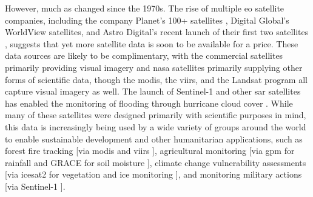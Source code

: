 However, much as changed since the 1970s. The rise of multiple \ac{eo} satellite companies, including the company Planet's 100+ satellites \cite{tepperSatelliteMakerPlanet2015}, Digital Global's WorldView satellites, and Astro Digital’s recent launch of their first two satellites \cite{shieberAstroDigitalLaunched2017}, suggests that yet more satellite data is soon to be available for a price. These data sources are likely to be complimentary, with the commercial satellites primarily providing visual imagery and \ac{nasa} satellites primarily supplying other forms of scientific data, though the \ac{modis}, the \ac{viirs}, and the Landsat program all capture visual imagery as well. The launch of Sentinel-1 and other \ac{sar} satellites has enabled the monitoring of flooding through hurricane cloud cover \cite{zhangMappingExtentMagnitude2018}. While many of these satellites were designed primarily with scientific purposes in mind, this data is increasingly being used by a wide variety of groups around the world to enable sustainable development and other humanitarian applications, such as forest fire tracking [via \ac{modis} and \ac{viirs} \cite{schroederNewVIIRS375m2014}], agricultural monitoring [via \ac{gpm} for rainfall \cite{houGlobalPrecipitationMeasurement2014} and GRACE for soil moisture \cite{wahrTimevariableGravityGRACE2004}], climate change vulnerability assessments [via \ac{icesat2} for vegetation and ice monitoring \cite{mcgillMultipleAltimeterBeam2013}], and monitoring military actions [via Sentinel-1 \cite{sanchezSARSupportWar2022}].


